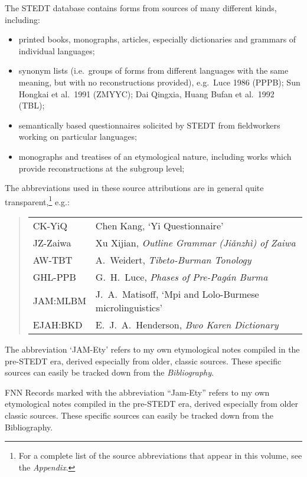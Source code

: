 The STEDT database contains forms from sources of many different kinds,
including:
\begin{itemize}
\item printed books, monographs, articles, especially dictionaries and grammars of
individual languages;
\item synonym lists (i.e.\ groups of forms from different languages with the same
meaning, but with no reconstructions provided), e.g.\ Luce 1986 (PPPB); Sun
Hongkai et al.\ 1991 (ZMYYC); Dai Qingxia, Huang Bufan et al.\ 1992 (TBL);
\item semantically based questionnaires solicited by STEDT from fieldworkers working
on particular languages;
\item monographs and treatises of an etymological nature, including works which
provide reconstructions at the subgroup level;
\end{itemize}

The abbreviations used in these source attributions are in general quite
transparent,\footnote{For a complete list of the source abbreviations that
appear in this volume, see the \textit{Appendix}.} e.g.:

\begin{quote}
\begin{tabular}{ll}
CK-YiQ	&Chen Kang, ‘Yi Questionnaire’\\
JZ-Zaiwa	&Xu Xijian, \textit{Outline Grammar (Jiǎnzhì) of Zaiwa}\\
AW-TBT	&A.~Weidert, \textit{Tibeto-Burman Tonology}\\
GHL-PPB	&G.~H.~Luce, \textit{Phases of Pre-Pag\'an Burma}\\
JAM:MLBM	&J.~A.~Matisoff, ‘Mpi and Lolo-Burmese microlinguistics’\\
EJAH:BKD	&E.~J.~A.~Henderson, \textit{Bwo Karen Dictionary}\\
\end{tabular}
\end{quote}

The abbreviation ‘JAM-Ety’ refers to my own etymological notes compiled in the
pre-STEDT era, derived especially from older, classic sources.  These specific
sources can easily be tracked down from the \textit{Bibliography}.

FNN Records marked with the abbreviation “Jam-Ety” refers to my own etymological notes compiled in the pre-STEDT era, derived especially from older classic sources. These specific sources can easily be tracked down from the Bibliography.


